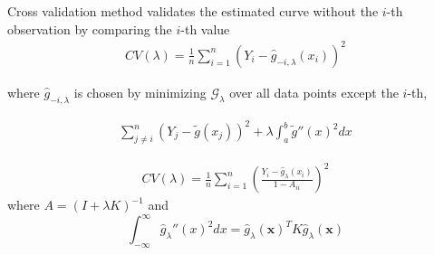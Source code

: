 Cross validation method validates the estimated curve without the
$i$-th observation by comparing the $i$-th value
\begin{align}
  \label{eq:74}
  CV(\lambda) = \frac{1}{n} \sum_{i=1}^{n} (Y_{i} - \hat g_{-i, \lambda}(x_{i}))^{2}
\end{align}

where $\hat g_{-i, \lambda}$ is chosen by minimizing
$\mathcal{G}_{\lambda}$ over all data points except the $i$-th,

\begin{align}
  \label{eq:76}
  \sum_{j \neq i}^{n} (Y_{j} - \tilde g(x_{j}))^{2} + \lambda
  \int_{a}^{b} \tilde g''(x)^{2} dx \tag{$\star$}
\end{align}

\begin{thm}
  \label{defn:nonparametric_regression:5}
  \begin{align}
    \label{eq:75}
    CV(\lambda) = \frac{1}{n} \sum_{i=1}^{n} (\frac{Y_{i} - \hat
      g_{\lambda}(x_{i})}{1 - A_{ii}})^{2}
  \end{align}
  where $A = (I + \lambda K)^{-1}$ and
  \begin{equation}
    \label{eq:80}
    \int_{-\infty}^{\infty}  \hat g_{\lambda}''(x)^{2} dx = \hat
    g_{\lambda}(\mathbf{x})^{T} K \hat g_{\lambda}(\mathbf{x})
  \end{equation}
\end{thm}

